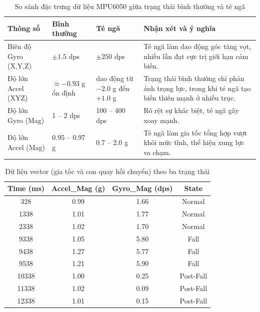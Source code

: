 \begin{table}[H]
\centering
\caption{So sánh đặc trưng dữ liệu MPU6050 giữa trạng thái bình thường và té ngã}
\label{tab:mpu6050_new_comparison}
\begin{tabularx}{\textwidth}{|l|p{2.5cm}|p{2.5cm}|X|}
\hline
\textbf{Thông số} & \textbf{Bình thường} & \textbf{Té ngã} & \textbf{Nhận xét và ý nghĩa} \\
\hline
Biên độ Gyro (X,Y,Z) & $\pm 1.5$ dps & $\pm 250$ dps & Té ngã làm dao động góc tăng vọt, nhiều lần đạt cực trị giới hạn cảm biến. \\
\hline
Độ lớn Accel (XYZ) & $\approx -0.93$ g ổn định & dao động từ $-2.0$ g đến $+1.0$ g & Trạng thái bình thường chỉ phản ánh trọng lực, trong khi té ngã tạo biến thiên mạnh ở nhiều trục. \\
\hline
Độ lớn Gyro (Mag) & 1 -- 2 dps & 100 -- 400 dps & Rõ rệt sự khác biệt, té ngã gây xoay mạnh. \\
\hline
Độ lớn Accel (Mag) & 0.95 -- 0.97 g & 0.7 -- 2.0 g & Té ngã làm gia tốc tổng hợp vượt khỏi mức tĩnh, thể hiện xung lực va chạm. \\
\hline
\end{tabularx}
\end{table}

\begin{table}[H]
\centering
\caption{Dữ liệu vector (gia tốc và con quay hồi chuyển) theo ba trạng thái}
\label{tab:vector_data}
\begin{tabular}{|c|c|c|c|}
\hline
\textbf{Time (ms)} & \textbf{Accel\_Mag (g)} & \textbf{Gyro\_Mag (dps)} & \textbf{State} \\
\hline
328   & 0.99 & 1.66 & Normal \\
1338  & 1.01 & 1.77 & Normal \\
2338  & 1.02 & 1.70 & Normal \\
9338  & 1.05 & 5.80 & Fall \\
9438  & 1.27 & 5.77 & Fall \\
9538  & 1.21 & 5.90 & Fall \\
10338 & 1.00 & 0.25 & Post-Fall \\
11338 & 1.02 & 0.09 & Post-Fall \\
12338 & 1.01 & 0.15 & Post-Fall \\
\hline
\end{tabular}
\end{table}

